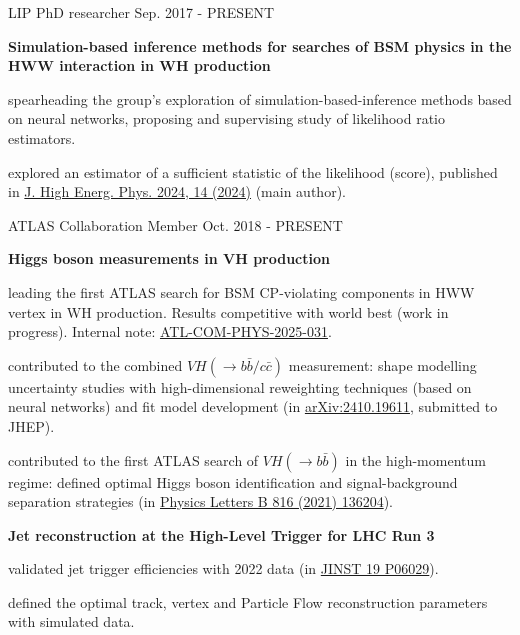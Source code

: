 

\begin{cventries}

    \cventry
    {LIP}
    {PhD researcher}
    {}
    {Sep. 2017 - PRESENT}
    {
        \textbf{Simulation-based inference methods for searches of BSM physics in the HWW interaction in WH production}\vspace{12pt}
        \begin{cvitems}      
            \item {spearheading the group's exploration of simulation-based-inference methods based on neural networks, proposing and supervising study of likelihood ratio estimators.}
            \item {explored an estimator of a sufficient statistic of the likelihood (score), published in \href{https://doi.org/10.1007/JHEP04(2024)014}{J. High Energ. Phys. 2024, 14 (2024)} (main author).}
        \end{cvitems}
    }

    \cventry
    {ATLAS Collaboration}
    {Member}
    {}
    {Oct. 2018 - PRESENT}
    {
        \textbf{Higgs boson measurements in VH production}\vspace{14pt}
        \begin{cvitems}
            \item {leading the first ATLAS search for BSM CP-violating components in HWW vertex in WH production. Results competitive with world best (work in progress). Internal note: \href{https://cds.cern.ch/record/2921718}{ATL-COM-PHYS-2025-031}.}
            \item {contributed to the combined $VH(\to b\bar{b}/c\bar{c})$ measurement: shape modelling uncertainty studies with high-dimensional reweighting techniques (based on neural networks) and fit model development (in \href{https://arxiv.org/abs/2410.19611}{arXiv:2410.19611}, submitted to JHEP).}
            \item {contributed to the first ATLAS search of $VH(\to b\bar{b})$ in the high-momentum regime: defined optimal Higgs boson identification and signal-background separation strategies (in \href{https://doi.org/10.1016/j.physletb.2021.136204}{Physics Letters B 816 (2021) 136204}).}
        \end{cvitems}\vspace{19pt}
        \textbf{Jet reconstruction at the High-Level Trigger for LHC Run 3}\vspace{14pt}
        \begin{cvitems}
            \item {validated jet trigger efficiencies with 2022 data (in \href{https://doi.org/10.1088/1748-0221/19/06/P06029}{JINST 19 P06029}).}
            \item {defined the optimal track, vertex and Particle Flow reconstruction parameters with simulated data.}
        \end{cvitems}
    }


\end{cventries}
